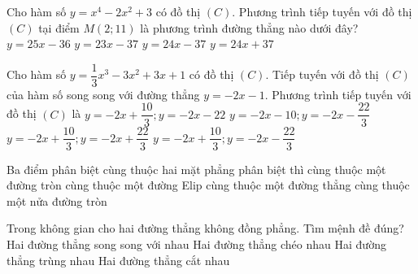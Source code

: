 \begin{ex}%
	Cho hàm số $y=x^4-2x^2+3$ có đồ thị $(C)$. Phương trình tiếp tuyến với đồ thị $(C)$ tại điểm $M(2;11)$ là phương trình đường thẳng nào dưới đây?
	\choice
	{$y=25x-36$}
	{$y=23x-37$}
	{\True $y=24x-37$}
	{$y=24x+37$}
\end{ex}

\begin{ex}%
	Cho hàm số $y=\dfrac{1}{3}x^3-3x^2+3x+1$ có đồ thị $(C)$. Tiếp tuyến với đồ thị $(C)$ của hàm số song song với đường thẳng $y=-2x-1$. Phương trình tiếp tuyến với đồ thị $(C)$ là
	\choice
	{$y=-2x + \dfrac{10}{3} ; y=-2x - 22$}
	{$y=-2x - 10 ; y=-2x - \dfrac{22}{3}$}
	{$y=-2x + \dfrac{10}{3} ; y=-2x + \dfrac{22}{3}$}
	{\True $y=-2x + \dfrac{10}{3} ; y=-2x - \dfrac{22}{3}$}
\end{ex}

\begin{ex}%
	Ba điểm phân biệt cùng thuộc hai mặt phẳng phân biệt thì
	\choice
	{cùng thuộc một đường tròn}
	{cùng thuộc một đường Elip}
	{\True cùng thuộc một đường thẳng}
	{cùng thuộc một nửa đường tròn}
\end{ex}

\begin{ex}%
	Trong không gian cho hai đường thẳng không đồng phẳng. Tìm mệnh đề đúng?
	\choice
	{Hai đường thẳng song song với nhau}
	{\True Hai đường thẳng chéo nhau}
	{Hai đường thẳng trùng nhau}
	{Hai đường thẳng cắt nhau}
\end{ex}

